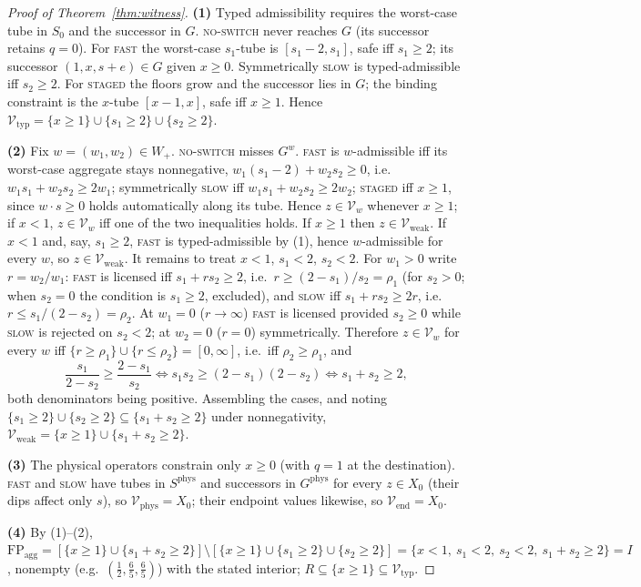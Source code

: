 \documentclass[preprint,11pt,authoryear]{elsarticle}
\theoremstyle{definition}
\theoremstyle{remark}
\newcommand{\Vtyp}{\mathcal{V}_{\mathrm{typ}}}
\newcommand{\Vweak}{\mathcal{V}_{\mathrm{weak}}}
\newcommand{\Vphys}{\mathcal{V}_{\mathrm{phys}}}
\newcommand{\Vend}{\mathcal{V}_{\mathrm{end}}}
\newcommand{\Wp}{W_+}
\newcommand{\FP}{\mathrm{FP}_{\mathrm{agg}}}
\newcommand{\act}[1]{\textsc{#1}}
\begin{document}
\begin{proof}[Proof of Theorem~\ref{thm:witness}]
\textbf{(1)} Typed admissibility requires the worst-case tube in $S_0$ and the successor in $G$. \act{no-switch} never reaches $G$ (its successor retains $q=0$). For \act{fast} the worst-case $s_1$-tube is $[s_1-2,s_1]$, safe iff $s_1\ge2$; its successor $(1,x,s+e)\in G$ given $x\ge0$. Symmetrically \act{slow} is typed-admissible iff $s_2\ge2$. For \act{staged} the floors grow and the successor lies in $G$; the binding constraint is the $x$-tube $[x-1,x]$, safe iff $x\ge1$. Hence $\Vtyp=\{x\ge1\}\cup\{s_1\ge2\}\cup\{s_2\ge2\}$.

\textbf{(2)} Fix $w=(w_1,w_2)\in\Wp$. \act{no-switch} misses $G^w$. \act{fast} is $w$-admissible iff its worst-case aggregate stays nonnegative, $w_1(s_1-2)+w_2s_2\ge0$, i.e.\ $w_1s_1+w_2s_2\ge2w_1$; symmetrically \act{slow} iff $w_1s_1+w_2s_2\ge2w_2$; \act{staged} iff $x\ge1$, since $w\cdot s\ge0$ holds automatically along its tube. Hence $z\in\mathcal V_w$ whenever $x\ge1$; if $x<1$, $z\in\mathcal V_w$ iff one of the two inequalities holds. If $x\ge1$ then $z\in\Vweak$. If $x<1$ and, say, $s_1\ge2$, \act{fast} is typed-admissible by (1), hence $w$-admissible for every $w$, so $z\in\Vweak$. It remains to treat $x<1$, $s_1<2$, $s_2<2$. For $w_1>0$ write $r=w_2/w_1$: \act{fast} is licensed iff $s_1+rs_2\ge2$, i.e.\ $r\ge(2-s_1)/s_2=\rho_1$ (for $s_2>0$; when $s_2=0$ the condition is $s_1\ge2$, excluded), and \act{slow} iff $s_1+rs_2\ge2r$, i.e.\ $r\le s_1/(2-s_2)=\rho_2$. At $w_1=0$ ($r\to\infty$) \act{fast} is licensed provided $s_2\ge0$ while \act{slow} is rejected on $s_2<2$; at $w_2=0$ ($r=0$) symmetrically. Therefore $z\in\mathcal V_w$ for every $w$ iff $\{r\ge\rho_1\}\cup\{r\le\rho_2\}=[0,\infty]$, i.e.\ iff $\rho_2\ge\rho_1$, and
\[
\frac{s_1}{2-s_2}\ge\frac{2-s_1}{s_2}\iff s_1s_2\ge(2-s_1)(2-s_2)\iff s_1+s_2\ge2,
\]
both denominators being positive. Assembling the cases, and noting $\{s_1\ge2\}\cup\{s_2\ge2\}\subseteq\{s_1+s_2\ge2\}$ under nonnegativity, $\Vweak=\{x\ge1\}\cup\{s_1+s_2\ge2\}$.

\textbf{(3)} The physical operators constrain only $x\ge0$ (with $q=1$ at the destination). \act{fast} and \act{slow} have tubes in $S^{\mathrm{phys}}$ and successors in $G^{\mathrm{phys}}$ for every $z\in X_0$ (their dips affect only $s$), so $\Vphys=X_0$; their endpoint values likewise, so $\Vend=X_0$.

\textbf{(4)} By (1)--(2), $\FP=[\{x\ge1\}\cup\{s_1+s_2\ge2\}]\setminus[\{x\ge1\}\cup\{s_1\ge2\}\cup\{s_2\ge2\}]=\{x<1,\ s_1<2,\ s_2<2,\ s_1+s_2\ge2\}=I$, nonempty (e.g.\ $(\tfrac12,\tfrac65,\tfrac65)$) with the stated interior; $R\subseteq\{x\ge1\}\subseteq\Vtyp$.


\end{proof}
\end{document}
